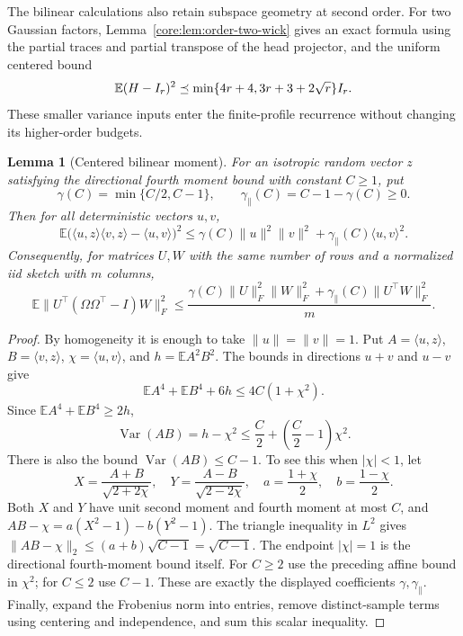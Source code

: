 \documentclass[11pt,a4paper]{article}
\newtheorem{lemma}[theorem]{Lemma}
\theoremstyle{definition}\newtheorem{definition}[theorem]{Definition}
\theoremstyle{remark}\newtheorem{remark}[theorem]{Remark}
\numberwithin{equation}{section}
\begin{document}
The bilinear calculations also retain subspace geometry at second order.
For two Gaussian factors, Lemma~\ref{core:lem:order-two-wick} gives
an exact formula using the partial traces and partial transpose of
the head projector, and the uniform centered bound
\[
 \mathbb E(H-I_r)^2\preceq
 \min\{4r+4,3r+3+2\sqrt r\}I_r.
\]
These smaller variance inputs enter the finite-profile recurrence
without changing its higher-order budgets.

\begin{lemma}[Centered bilinear moment]
\label{sharp:lem:bilinear}
For an isotropic random vector $z$ satisfying the directional fourth
moment bound with constant $C\ge1$, put
\[
 \gamma(C)=\min\{C/2,C-1\},\qquad
 \gamma_{\parallel}(C)=C-1-\gamma(C)\ge0.
\]
Then for all deterministic vectors $u,v$,
\begin{equation}\label{sharp:eq:bilinear}
 \mathbb E\bigl(\langle u,z\rangle\langle v,z\rangle
                   -\langle u,v\rangle\bigr)^2
 \le\gamma(C)\|u\|^2\|v\|^2
       +\gamma_{\parallel}(C)\langle u,v\rangle^2.
\end{equation}
Consequently, for matrices $U,W$ with the same number of rows and a
normalized iid sketch with $m$ columns,
\[
 \mathbb E\|U^\top(\Omega\Omega^\top-I)W\|_F^2
 \le\frac{\gamma(C)\|U\|_F^2\|W\|_F^2
                   +\gamma_{\parallel}(C)\|U^\top W\|_F^2}{m}.
\]
\end{lemma}
\begin{proof}
By homogeneity it is enough to take $\|u\|=\|v\|=1$. Put
$A=\langle u,z\rangle$, $B=\langle v,z\rangle$,
$\chi=\langle u,v\rangle$, and $h=\mathbb E A^2B^2$.
The bounds in directions $u+v$ and $u-v$ give
\[
 \mathbb E A^4+\mathbb E B^4+6h\le4C(1+\chi^2).
\]
Since $\mathbb E A^4+\mathbb E B^4\ge2h$,
\[
 \operatorname{Var}(AB)=h-\chi^2
 \le\frac C2+\left(\frac C2-1\right)\chi^2.
\]
There is also the bound $\operatorname{Var}(AB)\le C-1$.
To see this when $|\chi|<1$, let
\[
 X=\frac{A+B}{\sqrt{2+2\chi}},\quad
 Y=\frac{A-B}{\sqrt{2-2\chi}},\quad
 a=\frac{1+\chi}{2},\quad b=\frac{1-\chi}{2}.
\]
Both $X$ and $Y$ have unit second moment and fourth moment at most $C$,
and $AB-\chi=a(X^2-1)-b(Y^2-1)$. The triangle inequality in $L^2$
gives $\|AB-\chi\|_2\le(a+b)\sqrt{C-1}=\sqrt{C-1}$.
The endpoint $|\chi|=1$ is the directional fourth-moment bound itself.
For $C\ge2$ use the preceding affine bound in $\chi^2$; for $C\le2$
use $C-1$. These are exactly the displayed coefficients $\gamma,\gamma_{\parallel}$.
Finally, expand the Frobenius norm into entries, remove distinct-sample
terms using centering and independence, and sum this scalar inequality.
\end{proof}
\end{document}
